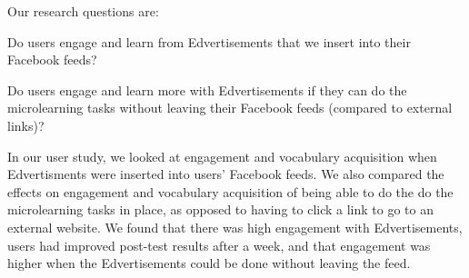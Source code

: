 \documentclass{sigchi}
\begin{document}
Our research questions are:

\begin{compactitem}
\item Do users engage and learn from Edvertisements that we insert into their Facebook feeds?
\item Do users engage and learn more with Edvertisements if they can do the microlearning tasks without leaving their Facebook feeds (compared to external links)?
\end{compactitem}

In our user study, we looked at engagement and vocabulary acquisition when Edvertisments were inserted into users' Facebook feeds. We also compared the effects on engagement and vocabulary acquisition of being able to do the do the microlearning tasks in place, as opposed to having to click a link to go to an external website. We found that there was high engagement with Edvertisements, users had improved post-test results after a week, and that engagement was higher when the Edvertisements could be done without leaving the feed. %

\end{document}
